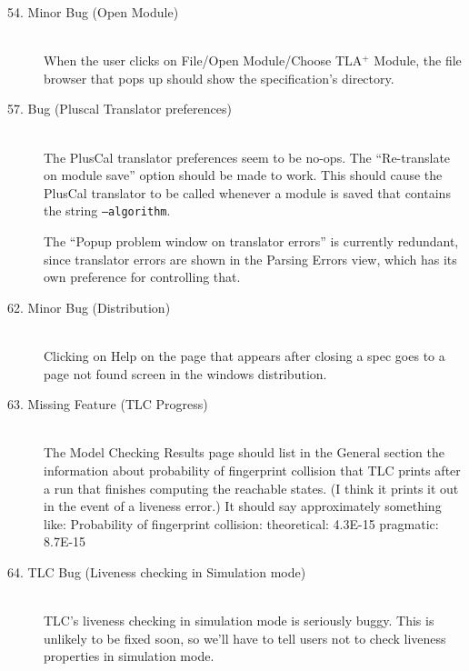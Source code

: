 \documentclass{article}
\newcommand{\TLA}[1]{TLA$^{+}$}
\begin{document}
\begin{description}
\item[54. Minor Bug (Open Module)] \mbox{}\\
%
When the user clicks on File/Open Module/Choose \TLA+ Module, the file
browser that pops up should show the specification's directory.

\item[57. Bug (Pluscal Translator preferences)] \mbox{}\\
%
The PlusCal translator preferences seem to be no-ops.  The
``Re-translate on module save'' option should be made to work.  This
should cause the PlusCal translator to be called whenever a module is
saved that contains the string \texttt{--algorithm}.

The ``Popup problem window on translator errors'' is currently
redundant, since translator errors are shown in the Parsing
Errors view, which has its own preference for controlling that.
    

\item[62. Minor Bug (Distribution)] \mbox{}\\
%
	Clicking on Help on the page that appears after closing a
spec 	goes to a page not found screen in the windows distribution.

\item[63. Missing Feature (TLC Progress)] \mbox{}\\
%
The Model Checking Results page should list in the General section the
information about probability of fingerprint collision that TLC prints
after a run that finishes computing the reachable states.  (I think it
prints it out in the event of a liveness error.)  It should say
approximately something like:
  Probability of fingerprint collision:
     theoretical: 4.3E-15  pragmatic: 8.7E-15

\item[64. TLC Bug (Liveness checking in Simulation mode)] \mbox{}\\
%
TLC's liveness checking in simulation mode is seriously buggy.  
This is unlikely to be fixed soon, so we'll
have to tell users not to check liveness properties in simulation
mode.  


\end{description}
\end{document}
